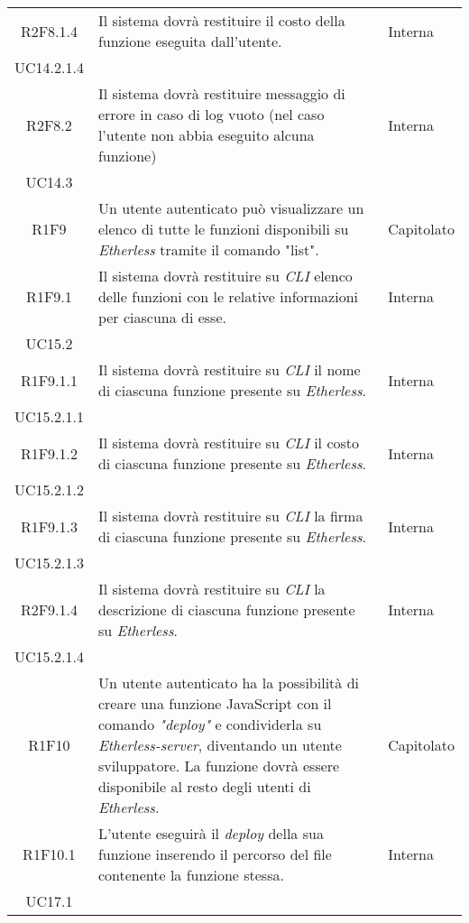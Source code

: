 \begin{longtable}{|c|p{8cm}|C{2cm}|}
	R2F8.1.4 &  Il sistema dovrà restituire il costo della funzione eseguita dall'utente. & \centering Interna \\ UC14.2.1.4 \tabularnewline
	
	R2F8.2 &  Il sistema dovrà restituire messaggio di errore in caso di log vuoto (nel caso l'utente non abbia eseguito alcuna funzione) & \centering Interna \\ UC14.3 \tabularnewline
	
	R1F9 &  Un utente autenticato può visualizzare un elenco di tutte le funzioni disponibili su \textit{Etherless} tramite il comando "list". & Capitolato \\	
	
	R1F9.1 &  Il sistema dovrà restituire su \textit{CLI\glo} elenco delle funzioni con le relative informazioni per ciascuna di esse. & \centering Interna \\ UC15.2 \tabularnewline
	
	R1F9.1.1 &  Il sistema dovrà restituire su \textit{CLI\glo} il nome di ciascuna funzione presente su \textit{Etherless}. & \centering Interna \\ UC15.2.1.1 \tabularnewline
	
	R1F9.1.2 &  Il sistema dovrà restituire su \textit{CLI\glo} il costo di ciascuna funzione presente su \textit{Etherless}. & \centering Interna \\ UC15.2.1.2 \tabularnewline
	
	R1F9.1.3 &  Il sistema dovrà restituire su \textit{CLI\glo} la firma di ciascuna funzione presente su \textit{Etherless}. & \centering Interna \\ UC15.2.1.3 \tabularnewline
	
	R2F9.1.4 &  Il sistema dovrà restituire su \textit{CLI\glo} la descrizione di ciascuna funzione presente su \textit{Etherless}. & \centering Interna \\ UC15.2.1.4 \tabularnewline
	
	R1F10 &  Un utente autenticato ha la possibilità di creare una funzione JavaScript con il comando \textit{"deploy\glos"} e condividerla su \textit{Etherless-server}, diventando un utente sviluppatore. La funzione dovrà essere disponibile al resto degli utenti di \textit{Etherless}. & Capitolato \\
	
	R1F10.1 &  L'utente eseguirà il \textit{deploy\glo} della sua funzione inserendo il percorso del file contenente la funzione stessa. & \centering Interna \\ UC17.1 \tabularnewline
	

\end{longtable}

